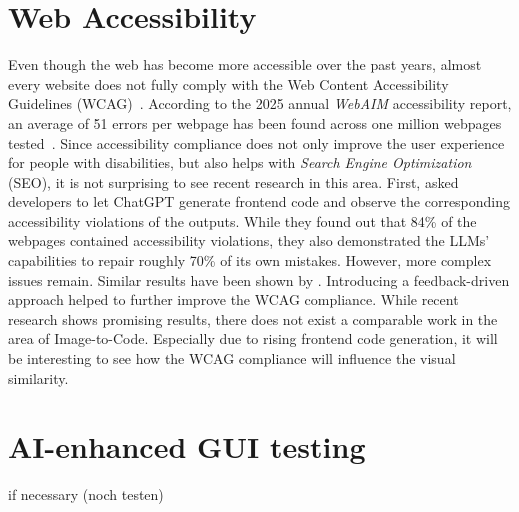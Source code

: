 \section{Web Accessibility}
Even though the web has become more accessible over the past years, almost every website 
does not fully comply with the Web Content Accessibility Guidelines 
(WCAG)~\parencite{wcag22}. According to the 2025 annual \textit{WebAIM}
accessibility report, an average of 51 errors per webpage has been 
found across one million webpages tested~\parencite{webaim2025million}.
Since accessibility compliance does not only improve the user
experience for people with disabilities, but also helps with 
\textit{Search Engine Optimization} (SEO), it is not surprising to see 
recent research in this area. First, \textcite{aljedaani2024chatgpt}
asked developers to let ChatGPT generate frontend code and observe 
the corresponding accessibility violations of the outputs. While they 
found out that 84\% of the webpages contained accessibility violations,
they also demonstrated the LLMs' capabilities to repair roughly 
70\% of its own mistakes. However, more complex issues remain. 
Similar results have been shown by \textcite{suh2025accessiblecode}.
Introducing a feedback-driven approach helped to further improve 
the WCAG compliance.\newline
While recent research shows promising results, there does not exist 
a comparable work in the area of Image-to-Code. Especially due 
to rising frontend code generation, it will be interesting to see 
how the WCAG compliance will influence the visual similarity.


\section{AI-enhanced GUI testing}
if necessary (noch testen)
